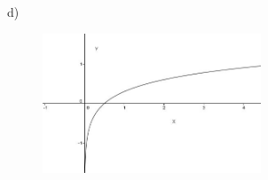 \documentclass[12pt]{article}
\begin{document}
\begin{enumerate}
\vspace{\baselineskip}
d)\par




\begin{figure}[H]
	\begin{Center}
		\includegraphics[width=2.56in,height=1.64in]{./media/image29.JPG}
	\end{Center}
\end{figure}



\par


\vspace{\baselineskip}

\end{enumerate}
\vspace{\baselineskip}
\end{document}
